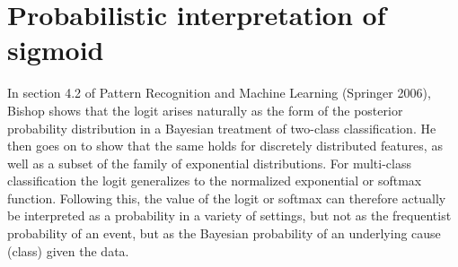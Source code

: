 \documentclass[]{article}
\theoremstyle{definition}
\begin{document}
\section{Probabilistic interpretation of sigmoid}




In section 4.2 of Pattern Recognition and Machine Learning (Springer 2006), Bishop shows that the logit arises naturally as the form of the posterior probability distribution in a Bayesian treatment of two-class classification. He then goes on to show that the same holds for discretely distributed features, as well as a subset of the family of exponential distributions. For multi-class classification the logit generalizes to the normalized exponential or softmax function. Following this, the value of the logit or softmax can therefore actually be interpreted as a probability in a variety of settings, but not as the frequentist probability of an event, but as the Bayesian probability of an underlying cause (class) given the data.
\end{document}
